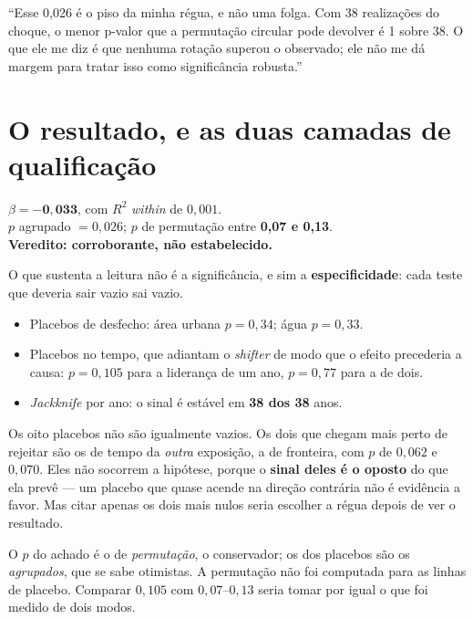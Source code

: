 \begin{nabanca}
``Esse 0,026 é o piso da minha régua, e não uma folga. Com 38 realizações do
choque, o menor p-valor que a permutação circular pode devolver é 1 sobre 38. O
que ele me diz é que nenhuma rotação superou o observado; ele não me dá margem
para tratar isso como significância robusta.''
\end{nabanca}

\section{O resultado, e as duas camadas de qualificação}

\begin{ancora}
$\beta = \mathbf{-0{,}033}$, com $R^2$ \emph{within} de $0{,}001$. \\
$p$ agrupado $= 0{,}026$; $p$ de permutação entre \textbf{0,07 e 0,13}. \\
\textbf{Veredito: corroborante, não estabelecido.}
\end{ancora}

O que sustenta a leitura não é a significância, e sim a \textbf{especificidade}:
cada teste que deveria sair vazio sai vazio.

\begin{itemize}
\item Placebos de desfecho: área urbana $p = 0{,}34$; água $p = 0{,}33$.
\item Placebos no tempo, que adiantam o \emph{shifter} de modo que o efeito
precederia a causa: $p = 0{,}105$ para a liderança de um ano, $p = 0{,}77$ para
a de dois.
\item \emph{Jackknife} por ano: o sinal é estável em \textbf{38 dos 38} anos.
\end{itemize}

\begin{armadilha}
Os oito placebos não são igualmente vazios. Os dois que chegam mais perto de
rejeitar são os de tempo da \emph{outra} exposição, a de fronteira, com $p$ de
$0{,}062$ e $0{,}070$. Eles não socorrem a hipótese, porque o \textbf{sinal
deles é o oposto} do que ela prevê --- um placebo que quase acende na direção
contrária não é evidência a favor. Mas citar apenas os dois mais nulos seria
escolher a régua depois de ver o resultado.
\end{armadilha}

\begin{armadilha}
O $p$ do achado é o de \emph{permutação}, o conservador; os dos placebos são os
\emph{agrupados}, que se sabe otimistas. A permutação não foi computada para as
linhas de placebo. Comparar $0{,}105$ com $0{,}07$--$0{,}13$ seria tomar por
igual o que foi medido de dois modos.
\end{armadilha}

